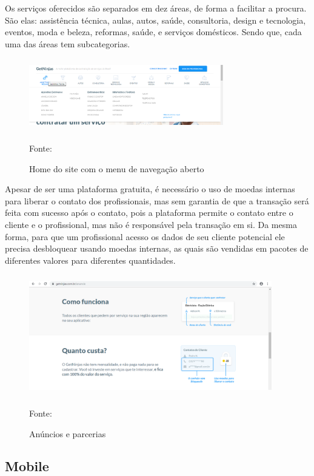 Os serviços oferecidos são separados em dez áreas, de forma a facilitar a procura. São elas: assistência técnica, aulas, autos, saúde, consultoria, design e tecnologia, eventos, moda e beleza, reformas, saúde, e serviços domésticos. Sendo que, cada uma das áreas tem subcategorias.

\begin{figure}[!h]
	\centering
	\caption{Home do site com o menu de navegação aberto}
	\includegraphics[width=320px, height=120px]{./images/getninjas2.png}
	\par {Fonte: \cite{get-ninjas}}
\end{figure}


Apesar de ser uma plataforma gratuita, é necessário o uso de moedas internas para liberar o contato dos profissionais, mas sem garantia de que a transação será feita com sucesso após o contato, pois a plataforma permite o contato entre o cliente e o profissional, mas não é responsável pela transação em si. Da mesma forma, para que um profissional acesso os dados de seu cliente potencial ele precisa desbloquear usando moedas internas, as quais são vendidas em pacotes de diferentes valores para diferentes quantidades.


\begin{figure}[!h]
	\centering
	\caption{Anúncios e parcerias }
	\includegraphics[width=400px, height=200px]{./images/getninjas3.png}
	\par {Fonte: \cite{get-ninjas-a}}
\end{figure}


\subsection{Mobile}


